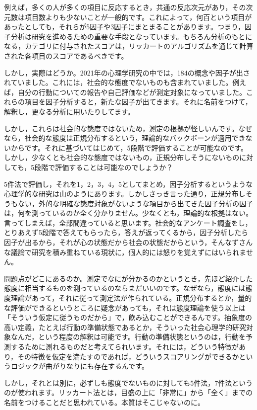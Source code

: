 \documentclass{ltjsbook}
\begin{document}
例えば，多くの人が多くの項目に反応するとき，共通の反応次元があり，その次元数は項目数よりも少ないことが一般的です。これによって，何百という項目があったとしても，それらが5因子や3因子にまとまることがあります。つまり，因子分析は研究を進めるための重要な手段となっています。もちろん分析のもとになる，カテゴリに付与されたスコアは，リッカートのアルゴリズムを通じて計算された各項目のスコアであるべきです。

しかし，実際はどうか。2021年の心理学研究の中では，184の概念や因子が出されていました。これには，社会的な態度でないものも含まれていました。例えば，自分の行動についての報告や自己評価などが測定対象になっていました。これらの項目を因子分析すると，新たな因子が出てきます。それに名前をつけて，解釈し，更なる分析に用いたりしてます。

しかし，これらは社会的な態度ではないため，測定の根拠が怪しいんです。なぜなら，社会的な態度は正規分布するという，理論的なバックボーンが適用できないからです。それに基づいてはじめて，5段階で評価することが可能なのです。しかし，少なくとも社会的な態度ではないもの，正規分布しそうにないものに対しても，5段階で評価することは可能なのでしょうか？

5件法で評価し，それを1，2，3，4，5としてまとめ，因子分析するというような心理学的な研究は山のようにあります。しかしさっき言った通り，正規分布しそうもない，外的な明確な態度対象がないような項目から出てきた因子分析の因子は，何を測っているのか全く分かりません。少なくとも，理論的な根拠はない。言ってしまえば，全部間違っていると思います。社会的なアンケート調査をし，とりあえず5段階で答えてもらったら，答えが返ってくるから，因子分析したら因子が出るから，それが心の状態だから社会の状態だからという，そんなずさんな議論で研究を積み重ねている現状に，個人的には怒りを覚えずにはいられません。

問題点がどこにあるのか。測定でなにが分かるのかというとき，先ほど紹介した態度に相当するものを測っているのならまだいいのです。なぜなら，態度には態度理論があって，それに従って測定法が作られている。正規分布するとか，量的な評価ができるというところに疑念があっても，それは態度理論を使う以上は「そういう仮定に従うものだから」で，飲み込むことができるんです。抽象度の高い定義，たとえば行動の準備状態であるとか，そういった社会心理学的研究対象なんだ，という程度の解釈は可能です。行動の準備状態というのは，行動を予測するために測れるものだと考えてられいます。それには，どういう特徴があり，その特徴を仮定を満たすのであれば，どういうスコアリングができるかというロジックが曲がりなりにも存在するんです。

しかし，それとは別に，必ずしも態度でないものに対しても5件法，7件法というのが使われます。リッカート法とは，目盛の上に「非常に」から「全く」までの名前をつけることだと思われている。本質はそこじゃないのに。
\end{document}
